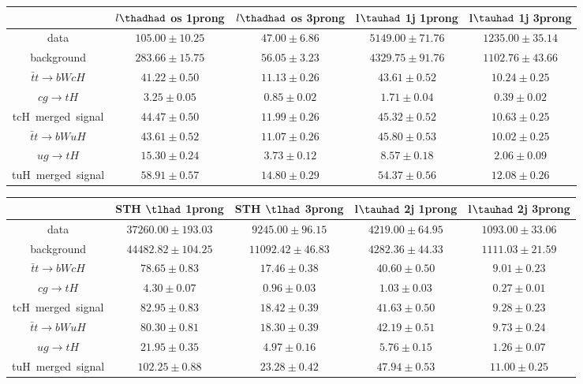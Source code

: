 \centering
\begin{tabular}{|c|c|c|c|c|} \hline
 & $l\thadhad$ os 1prong   & $l\thadhad$ os 3prong   & l$\tauhad$ 1j 1prong   & l$\tauhad$ 1j 3prong  \\\hline
data & $105.00\pm10.25$ & $47.00\pm6.86$ & $5149.00\pm71.76$ & $1235.00\pm35.14$\\\hline
background & $283.66\pm15.75$ & $56.05\pm3.23$ & $4329.75\pm91.76$ & $1102.76\pm43.66$\\\hline
$\bar{t}t\to bWcH$ & $41.22\pm0.50$ & $11.13\pm0.26$ & $43.61\pm0.52$ & $10.24\pm0.25$\\\hline
$cg\to tH$ & $3.25\pm0.05$ & $0.85\pm0.02$ & $1.71\pm0.04$ & $0.39\pm0.02$\\\hline
tcH~merged~signal & $44.47\pm0.50$ & $11.99\pm0.26$ & $45.32\pm0.52$ & $10.63\pm0.25$\\\hline
$\bar{t}t\to bWuH$ & $43.61\pm0.52$ & $11.07\pm0.26$ & $45.80\pm0.53$ & $10.02\pm0.25$\\\hline
$ug\to tH$ & $15.30\pm0.24$ & $3.73\pm0.12$ & $8.57\pm0.18$ & $2.06\pm0.09$\\\hline
tuH~merged~signal & $58.91\pm0.57$ & $14.80\pm0.29$ & $54.37\pm0.56$ & $12.08\pm0.26$\\\hline
\end{tabular}
\begin{tabular}{|c|c|c|c|c|} \hline
 & STH $\tlhad$  1prong   & STH $\tlhad$  3prong   & l$\tauhad$ 2j 1prong   & l$\tauhad$ 2j 3prong  \\\hline
data & $37260.00\pm193.03$ & $9245.00\pm96.15$ & $4219.00\pm64.95$ & $1093.00\pm33.06$\\\hline
background & $44482.82\pm104.25$ & $11092.42\pm46.83$ & $4282.36\pm44.33$ & $1111.03\pm21.59$\\\hline
$\bar{t}t\to bWcH$ & $78.65\pm0.83$ & $17.46\pm0.38$ & $40.60\pm0.50$ & $9.01\pm0.23$\\\hline
$cg\to tH$ & $4.30\pm0.07$ & $0.96\pm0.03$ & $1.03\pm0.03$ & $0.27\pm0.01$\\\hline
tcH~merged~signal & $82.95\pm0.83$ & $18.42\pm0.39$ & $41.63\pm0.50$ & $9.28\pm0.23$\\\hline
$\bar{t}t\to bWuH$ & $80.30\pm0.81$ & $18.30\pm0.39$ & $42.19\pm0.51$ & $9.73\pm0.24$\\\hline
$ug\to tH$ & $21.95\pm0.35$ & $4.97\pm0.16$ & $5.76\pm0.15$ & $1.26\pm0.07$\\\hline
tuH~merged~signal & $102.25\pm0.88$ & $23.28\pm0.42$ & $47.94\pm0.53$ & $11.00\pm0.25$\\\hline
\end{tabular}
